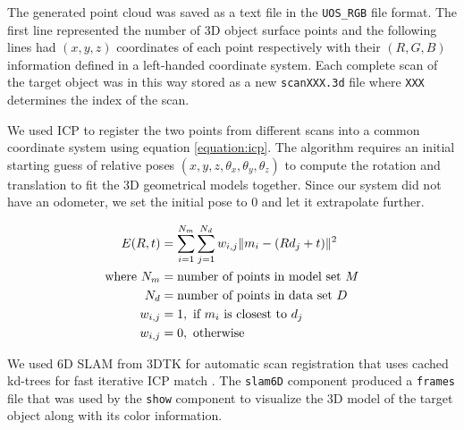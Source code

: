 The generated point cloud was saved as a text file in the \texttt{UOS\_RGB}
file format. The first line represented the number of 3D object surface points
and the following lines had $(x, y, z)$ coordinates of each point respectively
with their $(R, G, B)$ information defined in a left-handed coordinate system.
Each complete scan of the target object was in this way stored as a new
\texttt{scanXXX.3d} file where \texttt{XXX} determines the index of the scan.

We used \ac{ICP} \cite{besl:1992} to register the two points from different
scans into a common coordinate system using equation \ref{equation:icp}. The
algorithm requires an initial starting guess of relative poses $(x, y, z,
\theta_x, \theta_y, \theta_z)$ to compute the rotation and translation to fit
the 3D geometrical models together. Since our system did not have an odometer,
we set the initial pose to 0 and let it extrapolate further.

\begin{align}
	\label{equation:icp}
	E(R, t) &= \sum_{i=1}^{N_m} \sum_{j=1}^{N_d} w_{i,j}\| m_i - (Rd_j + t) \|^2 \notag \\
	\text{where}~ N_m &= \text{number of points in model set}~ M \notag \\
						N_d &= \text{number of points in data set}~ D \notag \\
						w_{i,j} &= 1, ~\text{if}~ m_i~ \text{is closest to}~	d_j \notag \\
						w_{i,j} &= 0, ~\text{otherwise}
\end{align}

We used 6D \ac{SLAM} from \ac{3DTK} \cite{3dtk:2012} for automatic scan
registration that uses cached kd-trees for fast iterative \ac{ICP} match
\cite{nuchter:2007}. The \texttt{slam6D} component produced a \texttt{frames}
file that was used by the \texttt{show} component to visualize the 3D model of
the target object along with its color information.
